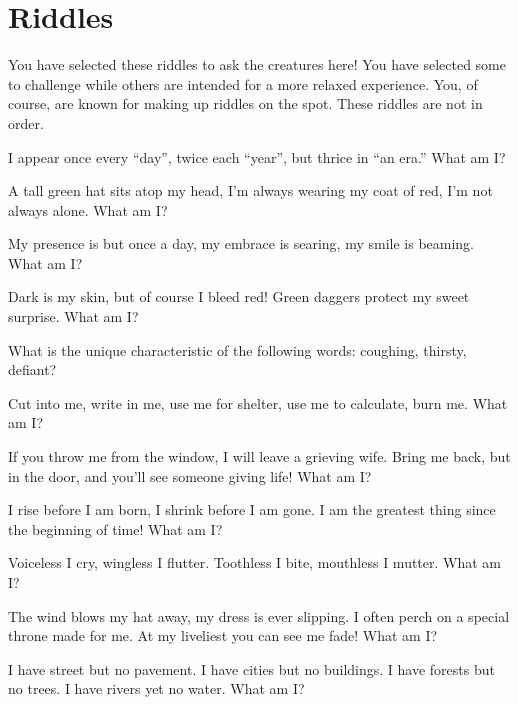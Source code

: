 \documentclass[green]{guildcamp2}
\begin{document}
\name{\gsphinxriddles{}}

\section{Riddles}
You have selected these riddles to ask the creatures here! You have selected some to challenge while others are intended for a more relaxed experience. You, of course, are known for making up riddles on the spot. These riddles are not in order.

\begin{enum}
	\item I appear once every ``day'', twice each ``year'', but thrice in ``an era.'' What am I?
	
	\item A tall green hat sits atop my head, I'm always wearing my coat of red, I'm not always alone. What am I?
	
	\item My presence is but once a day, my embrace is searing, my smile is beaming. What am I?
	
	\item Dark is my skin, but of course I bleed red! Green daggers protect my sweet surprise. What am I?
	
	\item What is the unique characteristic of the following words: coughing, thirsty, defiant?
	
	\item Cut into me, write in me, use me for shelter, use me to calculate, burn me. What am I?
	
	\item If you throw me from the window, I will leave a grieving wife. Bring me back, but in the door, and you'll see someone giving life! What am I?
	
	\item I rise before I am born, I shrink before I am gone. I am the greatest thing since the beginning of time! What am I?
	
	\item Voiceless I cry, wingless I flutter. Toothless I bite, mouthless I mutter. What am I?
	
	\item The wind blows my hat away, my dress is ever slipping. I often perch on a special throne made for me. At my liveliest you can see me fade! What am I?
	
	\item I have street but no pavement. I have cities but no buildings. I have forests but no trees. I have rivers yet no water. What am I?
	

\end{enum}
\end{document}
